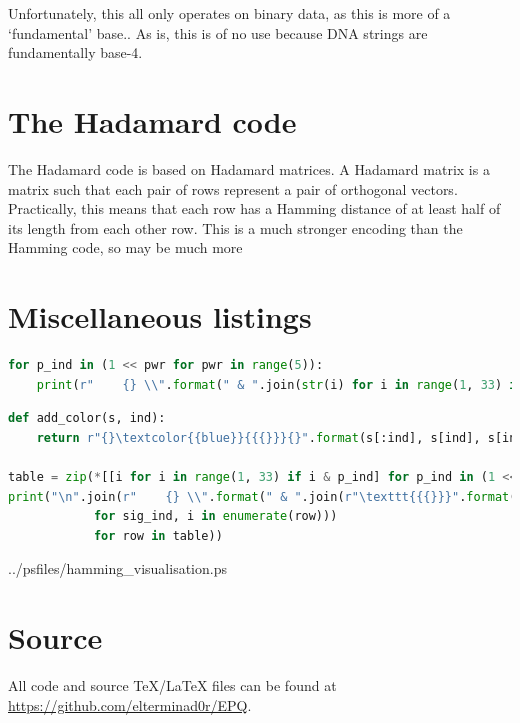 \documentclass{article}
\begin{document}
    Unfortunately, this all only operates on binary data, as this is more of a
    `fundamental' base.. As is, this is of no use because DNA strings are
    fundamentally base-4.

    \section{The Hadamard code}


    The Hadamard code is based on Hadamard matrices. A Hadamard matrix is a
    matrix such that each pair of rows represent a pair of orthogonal vectors.
    Practically, this means that each row has a Hamming distance of at least
    half of its length from each other row. This is a much stronger encoding
    than the Hamming code, so may be much more

    \section{Miscellaneous listings}

\begin{lstlisting}[language=Python, caption=Generating Hamming coverage indices,
                   label=lst:hamtab]
for p_ind in (1 << pwr for pwr in range(5)):
    print(r"    {} \\".format(" & ".join(str(i) for i in range(1, 33) if i & p_ind)))
\end{lstlisting}

\begin{lstlisting}[language=Python, caption=Generating binary table,
                   label={lst:hamcol}]
def add_color(s, ind):
    return r"{}\textcolor{{blue}}{{{}}}{}".format(s[:ind], s[ind], s[ind+1:])

table = zip(*[[i for i in range(1, 33) if i & p_ind] for p_ind in (1 << pwr for pwr in range(5))])
print("\n".join(r"    {} \\".format(" & ".join(r"\texttt{{{}}}".format(add_color(bin(i)[2:].rjust(5, "0"), 4 -sig_ind))
            for sig_ind, i in enumerate(row)))
            for row in table))
\end{lstlisting}


{../psfiles/hamming_visualisation.ps}

    \section{Source}

    All code and source \TeX/\LaTeX{} files can be found at
    \url{https://github.com/elterminad0r/EPQ}.


\nocite{*}



\end{document}
